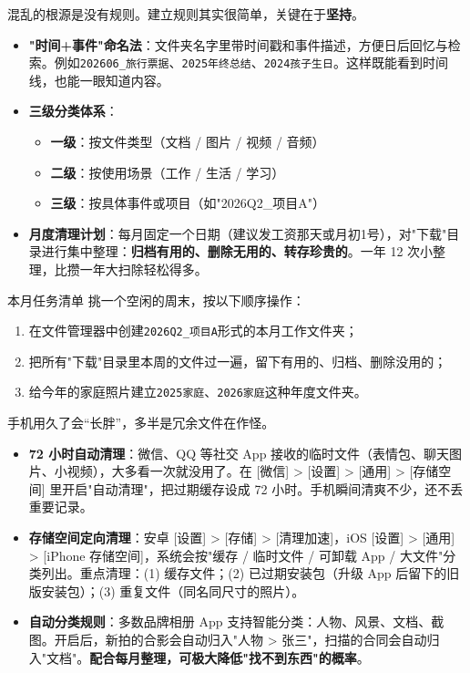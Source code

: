 
混乱的根源是没有规则。建立规则其实很简单，关键在于\textbf{坚持}。

\begin{itemize}
  \item \textbf{"时间+事件"命名法}：文件夹名字里带时间戳和事件描述，方便日后回忆与检索。例如\texttt{202606\_旅行票据}、\texttt{2025年终总结}、\texttt{2024孩子生日}。这样既能看到时间线，也能一眼知道内容。
  \item \textbf{三级分类体系}：
  \begin{itemize}
    \item \textbf{一级}：按文件类型（文档 / 图片 / 视频 / 音频）
    \item \textbf{二级}：按使用场景（工作 / 生活 / 学习）
    \item \textbf{三级}：按具体事件或项目（如"2026Q2\_项目A"）
  \end{itemize}
  \item \textbf{月度清理计划}：每月固定一个日期（建议发工资那天或月初1号），对"下载"目录进行集中整理：\textbf{归档有用的、删除无用的、转存珍贵的}。一年 12 次小整理，比攒一年大扫除轻松得多。
\end{itemize}

\begin{tcbpractice}{本月任务清单}
挑一个空闲的周末，按以下顺序操作：

\begin{enumerate}
  \item 在文件管理器中创建\texttt{2026Q2\_项目A}形式的本月工作文件夹；
  \item 把所有"下载"目录里本周的文件过一遍，留下有用的、归档、删除没用的；
  \item 给今年的家庭照片建立\texttt{2025家庭}、\texttt{2026家庭}这种年度文件夹。
\end{enumerate}

\end{tcbpractice}


手机用久了会“长胖”，多半是冗余文件在作怪。

\begin{itemize}
  \item \textbf{72 小时自动清理}：微信、QQ 等社交 App 接收的临时文件（表情包、聊天图片、小视频），大多看一次就没用了。在 [微信] > [设置] > [通用] > [存储空间] 里开启"自动清理"，把过期缓存设成 72 小时。手机瞬间清爽不少，还不丢重要记录。
  \item \textbf{存储空间定向清理}：安卓 [设置] > [存储] > [清理加速]，iOS [设置] > [通用] > [iPhone 存储空间]，系统会按"缓存 / 临时文件 / 可卸载 App / 大文件"分类列出。重点清理：(1) 缓存文件；(2) 已过期安装包（升级 App 后留下的旧版安装包）；(3) 重复文件（同名同尺寸的照片）。
  \item \textbf{自动分类规则}：多数品牌相册 App 支持智能分类：人物、风景、文档、截图。开启后，新拍的合影会自动归入"人物 > 张三"，扫描的合同会自动归入"文档"。\textbf{配合每月整理，可极大降低"找不到东西"的概率}。
\end{itemize}

